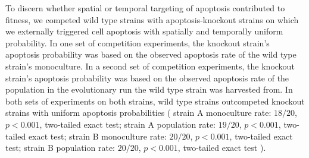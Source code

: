 To discern whether spatial or temporal targeting of apoptosis contributed to fitness, we competed wild type strains with apoptosis-knockout strains on which we externally triggered cell apoptosis with spatially and temporally uniform probability.
In one set of competition experiments, the knockout strain's apoptosis probability was based on the observed apoptosis rate of the wild type strain's monoculture.
In a second set of competition experiments, the knockout strain's apoptosis probability was based on the observed apoptosis rate of the population in the evolutionary run the wild type strain was harvested from.
In both sets of experiments on both strains, wild type strains outcompeted knockout strains with uniform apoptosis probabilities
(%
strain A \@ monoculture rate: $18/20$, $p < 0.001$, two-tailed exact test;
strain A \@ population rate: $19/20$, $p < 0.001$, two-tailed exact test;
strain B \@ monoculture rate: $20/20$, $p < 0.001$, two-tailed exact test;
strain B \@ population rate: $20/20$, $p < 0.001$, two-tailed exact test%
). %
